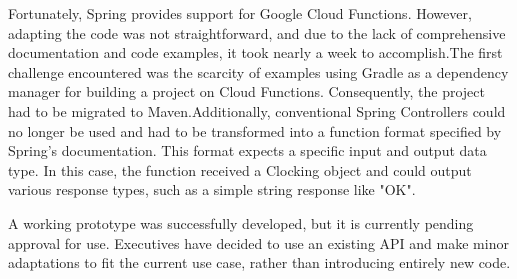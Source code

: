 Fortunately, Spring provides support for Google Cloud Functions. However, adapting the code was 
not straightforward, and due to the lack of comprehensive documentation and code examples, it took 
nearly a week to accomplish.The first challenge encountered was the scarcity of examples using 
Gradle as a dependency manager for building a project on Cloud Functions. Consequently, the 
project had to be migrated to Maven.Additionally, conventional Spring Controllers could no longer 
be used and had to be transformed into a function format specified by Spring's documentation. This 
format expects a specific input and output data type. In this case, the function received a 
Clocking object and could output various response types, such as a simple string response like 
"OK".

A working prototype was successfully developed, but it is currently pending approval for use. 
Executives have decided to use an existing API and make minor adaptations to fit the current use 
case, rather than introducing entirely new code.

